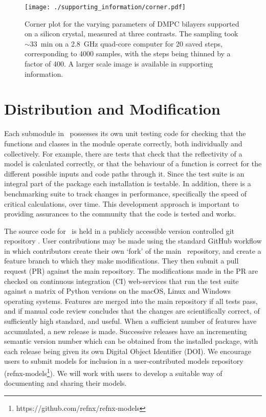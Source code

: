 \documentclass[pdf,preprint]{article}
\begin{document}
\begin{figure}
  \texttt{[image: ./supporting\_information/corner.pdf]}
  \caption{Corner plot for the varying parameters of DMPC bilayers supported on a silicon crystal, measured at three contrasts. The sampling took $\sim$\SI{33}{\minute} on a \SI{2.8}{GHz} quad-core computer for 20 saved steps, corresponding to 4000 samples, with the steps being thinned by a factor of 400. A larger scale image is available in supporting information.}
  \label{fig:corner}
\end{figure}

 
\section{Distribution and Modification}

Each submodule in \ possesses its own unit testing code for checking that the functions and classes in the module operate correctly, both individually and collectively. For example, there are tests that check that the reflectivity of a model is calculated correctly, or that the behaviour of a function is correct for the different possible inputs and code paths through it. Since the test suite is an integral part of the package each installation is testable. In addition, there is a benchmarking suite to track changes in performance, specifically the speed of critical calculations, over time. This development approach is important to providing assurances to the community that the code is tested and works.

The source code for \ is held in a publicly accessible version controlled git repository \cite{refnx}. User contributions may be made using the standard GitHub workflow in which contributors create their own `fork' of the main \ repository, and create a feature branch to which they make modifications.
They then submit a pull request (PR) against the main repository. The modifications made in the PR are checked on continuous integration (CI) web-services that run the test suite against a matrix of Python versions on the macOS, Linux and Windows operating systems. Features are merged into the main repository if all tests pass, and if manual code review concludes that the changes are scientifically correct, of sufficiently high standard, and useful. When a sufficient number of features have accumulated, a new release is made. Successive releases have an incrementing semantic version number which can be obtained from the installed package, with each release being given its own Digital Object Identifier (DOI).
We encourage users to submit models for inclusion in a user-contributed models repository (refnx-models\footnote{https://github.com/refnx/refnx-models}). We will work with users to develop a suitable way of documenting and sharing their models.
\end{document}
